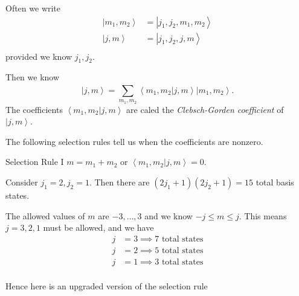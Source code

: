 \documentclass[phys334]{subfiles}
\begin{document}
    Often we write
    \begin{equation*}
        \begin{aligned}
            \left| m_1,m_2 \right\rangle & = \left| j_1,j_2,m_1,m_2 \right\rangle \\
            \left| j,m \right\rangle & = \left| j_1,j_2,j,m \right\rangle \\
        \end{aligned} 
    \end{equation*}
    provided we know $j_1,j_2$.

    Then we know
    \begin{equation*}
        \left| j,m \right\rangle = \sum^{}_{m_1,m_2} \left\langle m_1,m_2 | j,m \right\rangle\left| m_1,m_2 \right\rangle.
    \end{equation*}
    The coefficients $\left\langle m_1,m_2 | j,m \right\rangle$ are caled the \textit{Clebsch-Gorden coefficient} of $\left| j,m \right\rangle$.

    The following selection rules tell us when the coefficients are nonzero.

    \begin{fact}{Selection Rule I}
        $m = m_1+m_2$ or $\left\langle m_1,m_2 | j,m \right\rangle = 0$.
    \end{fact}

    \clearpage

    \begin{example}{}
        Consider $j_1=2,j_2=1$. Then there are $\left( 2j_1+1 \right)\left( 2j_2+1 \right) = 15$ total basis states.

        The allowed values of $m$ are $-3,\ldots,3$ and we know $-j\leq m\leq j$. This means $j=3,2,1$ must be allowed, and we have
        \begin{equation*}
            \begin{aligned}
                j&=3 \implies \text{7 total states} \\
                j&=2 \implies \text{5 total states} \\
                j&=1 \implies \text{3 total states}\\
            \end{aligned} 
        \end{equation*}
    \end{example}
    
    \rruleline

    \np Hence here is an upgraded version of the selection rule
\end{document}
